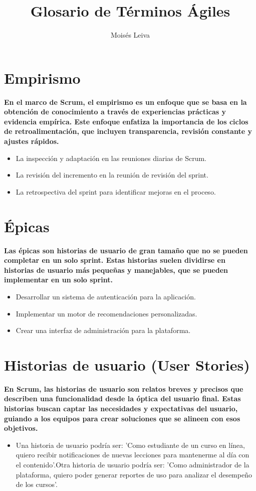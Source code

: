 \documentclass[twocolumn]{article}
\title{Glosario de Términos Ágiles}
\author{Moisés Leiva}
\date{}
\begin{document}
\maketitle
\section*{Empirismo}
\textbf{En el marco de Scrum, el empirismo es un enfoque que se basa en la obtención de conocimiento a través de experiencias prácticas y evidencia empírica. Este enfoque enfatiza la importancia de los ciclos de retroalimentación, que incluyen transparencia, revisión constante y ajustes rápidos.}
\begin{itemize}[label=\textbullet]
\item La inspección y adaptación en las reuniones diarias de Scrum.
\item La revisión del incremento en la reunión de revisión del sprint.
\item La retrospectiva del sprint para identificar mejoras en el proceso.
\end{itemize}
\section*{Épicas}
\textbf{Las épicas son historias de usuario de gran tamaño que no se pueden completar en un solo sprint. Estas historias suelen dividirse en historias de usuario más pequeñas y manejables, que se pueden implementar en un solo sprint.}
\begin{itemize}[label=\textbullet]
\item Desarrollar un sistema de autenticación para la aplicación.
\item Implementar un motor de recomendaciones personalizadas.
\item Crear una interfaz de administración para la plataforma.
\end{itemize}
\section*{Historias de usuario (User Stories)}
\textbf{En Scrum, las historias de usuario son relatos breves y precisos que describen una funcionalidad desde la óptica del usuario final. Estas historias buscan captar las necesidades y expectativas del usuario, guiando a los equipos para crear soluciones que se alineen con esos objetivos.}
\begin{itemize}[label=\textbullet]
\item Una historia de usuario podría ser: 'Como estudiante de un curso en línea, quiero recibir notificaciones de nuevas lecciones para mantenerme al día con el contenido'.Otra historia de usuario podría ser: 'Como administrador de la plataforma, quiero poder generar reportes de uso para analizar el desempeño de los cursos'.
\end{itemize}
\end{document}
